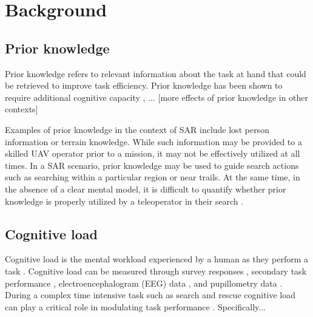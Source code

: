 \documentclass{article}
\begin{document}

\section{Background}
\subsection{Prior knowledge}
Prior knowledge refers to relevant information about the task at hand that could be retrieved to improve task efficiency. Prior knowledge has been shown to require additional cognitive capacity \cite{Britton1982}, ... [more effects of prior knowledge in other contexts]

Examples of prior knowledge in the context of SAR include lost person information or terrain knowledge. While such information may be provided to a skilled UAV operator prior to a mission, it may not be effectively utilized at all times. In a  SAR scenario, prior knowledge may be used to guide search actions such as searching within a particular region or near trails. At the same time, in the absence of a clear mental model, it is difficult to quantify whether prior knowledge is properly utilized by a teleoperator in their search \cite{Burke2004}. 


\subsection{Cognitive load}
Cognitive load is the mental workload experienced by a human as they perform a task \cite{Paas2003}. Cognitive load can be measured through survey responses \cite{Sweller2011}, secondary task performance \cite{Anderson2011}, electroencephalogram (EEG)  data \cite{many papers}, and pupillometry data \cite{more papers}.  During a complex time intensive task such as search and rescue cognitive load can play a critical role in modulating task performance \cite{?}. Specifically...
\end{document}
